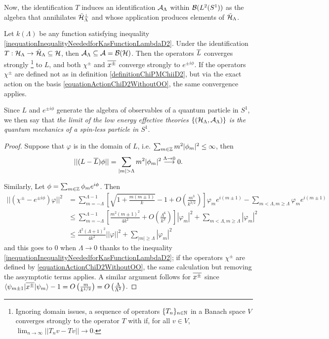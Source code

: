 Now, the identification $T$ induces an identification $\mathcal A_\Lambda$ within $\mathcal B(L^2(S^1))$ as the algebra that annihilates $\tilde {\mathcal H}_\Lambda^\perp$ and whose application produces elements of $\tilde {\mathcal H}_\Lambda$. 

\begin{theorem}\label{theoremConvergesToQMD2}
Let $k(\Lambda)$ be any function satisfying inequality \eqref{inequationInequalityNeededforKasFunctionLambdaD2}. Under the identification $T: \mathcal H_\Lambda \to \tilde {\mathcal H}_\Lambda \subseteq \mathcal H$, then $\mathcal A_\Lambda \subseteq \mathcal A = \mathcal B (\mathcal H)$. Then the operators $\overline{L} $ converges strongly
\footnote{Ignoring domain issues, a sequence of operators $\{T_n\}_{n \in \mathbb{N}}$ in a Banach space $V$ converges strongly to the operator $T$ with if, for all $v \in V$, $\lim_{n \to \infty} ||T_n v - T v|| \to 0$.}
 to $L$, and both $\chi^\pm$ and $\overline{x^\pm}$ converge strongly to $e^{\pm i\phi}$. If the operators $\chi^\pm$ are defined not as in definition \ref{definitionChiPMChiiD2}, but via the exact action on the basis \eqref{equationActionChiD2WithoutOO}, the same convergence applies.

\noindent Since $L$ and $e^{\pm i \phi}$ generate the algebra of observables of a quantum particle in $S^1$, we then say that \emph{the limit of the low energy effective theories $\{(\mathcal H_\Lambda, \mathcal A_\Lambda)\}$ is the quantum mechanics of a spin-less particle in $S^1$}.

\end{theorem}

\begin{proof}
Suppose that $\varphi$ is in the domain of $L$, i.e. $\sum_{m \in \ZZ} m^2 |\phi_m|^2 \leq \infty$, then
\begin{align*}
    ||(L - \cut L)\varphi|| = \sum_{|m| > \Lambda} m^2 |\phi_m|^2 \overset{\Lambda \to 0}{\longrightarrow} 0.
\end{align*}

Similarly, Let $\varphi = \sum_{m \in \ZZ} \varphi_m e^{i \phi}$. Then
\begin{align*}
    ||(\chi^\pm - e^{\pm i \phi})\varphi||^2 &= \sum_{m = - \Lambda}^{\Lambda-1} \left[ \sqrt{1 + \frac{m(m \pm 1)}{k}} - 1 + O\left(\frac{m^3}{k^{3/2}} \right)\right] \varphi_m e^{i(m \pm 1)} - \sum_{m < \Lambda, m \geq \Lambda} \varphi_m e^{i(m \pm 1)}\\
    &\leq \sum_{m = -\Lambda}^{\Lambda-1} \left[\frac{m^2(m\pm 1)^2}{4k^2} + O\left(\frac{\Lambda^6}{k^{3}} \right)\right] |\varphi_m|^2 + \sum_{m < \Lambda, m \geq \Lambda} |\varphi_m|^2 \\
    &\leq \frac{\Lambda^2(\Lambda+1)^2}{4k^2} ||\varphi||^2 + \sum_{|m|\geq \Lambda} |\varphi_m|^2
\end{align*}
and this goes to $0$ when $\Lambda \to 0$ thanks to the inequality \eqref{inequationInequalityNeededforKasFunctionLambdaD2}; if the operators $\chi^\pm$ are defined by \eqref{equationActionChiD2WithoutOO}, the same calculation but removing the assymptotic terms applies. A similar argument follows for $\overline{x^\pm}$ since $\langle\psi_{m\pm 1} | \overline{x^\pm} | \psi_m\rangle - 1 = O\left(\frac{m}{k^{1/2}}\right) = O\left(\frac{\Lambda}{\Lambda^2} \right)$.
\end{proof}

